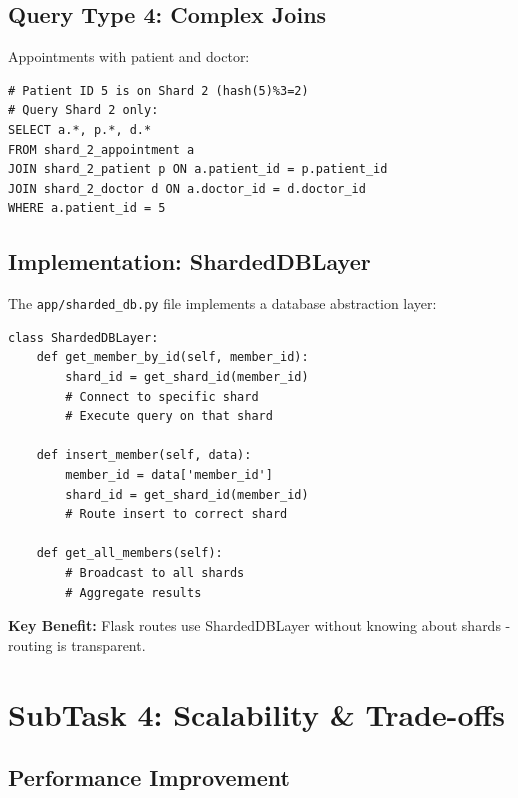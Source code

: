 \documentclass[12pt,a4paper]{article}
\begin{document}
\subsection{Query Type 4: Complex Joins}

Appointments with patient and doctor:

\begin{lstlisting}[caption=Single-Shard Join]
# Patient ID 5 is on Shard 2 (hash(5)%3=2)
# Query Shard 2 only:
SELECT a.*, p.*, d.*
FROM shard_2_appointment a
JOIN shard_2_patient p ON a.patient_id = p.patient_id
JOIN shard_2_doctor d ON a.doctor_id = d.doctor_id
WHERE a.patient_id = 5
\end{lstlisting}

\subsection{Implementation: ShardedDBLayer}

The \texttt{app/sharded\_db.py} file implements a database abstraction layer:

\begin{lstlisting}[caption=ShardedDBLayer Class Structure]
class ShardedDBLayer:
    def get_member_by_id(self, member_id):
        shard_id = get_shard_id(member_id)
        # Connect to specific shard
        # Execute query on that shard
        
    def insert_member(self, data):
        member_id = data['member_id']
        shard_id = get_shard_id(member_id)
        # Route insert to correct shard
        
    def get_all_members(self):
        # Broadcast to all shards
        # Aggregate results
\end{lstlisting}

\textbf{Key Benefit:} Flask routes use ShardedDBLayer without knowing about shards - routing is transparent.

\section{SubTask 4: Scalability \& Trade-offs}

\subsection{Performance Improvement}
\end{document}
